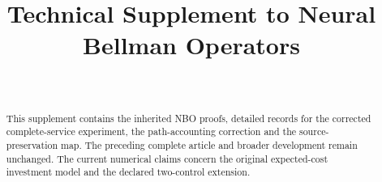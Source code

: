 \documentclass[ecta,nameyear,draft]{econsocart}
\begin{document}
\begin{frontmatter}
\title{Technical Supplement to Neural Bellman Operators}
\begin{aug}
\author[id=au1,addressref={add1}]{~}
\address[id=add1]{Peking University}
\end{aug}
\begin{abstract}
This supplement contains the inherited NBO proofs, detailed records for the corrected complete-service experiment, the path-accounting correction and the source-preservation map. The preceding complete article and broader development remain unchanged. The current numerical claims concern the original expected-cost investment model and the declared two-control extension.
\end{abstract}
\end{frontmatter}




\end{document}
